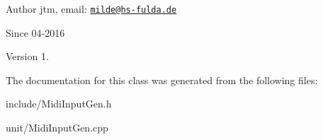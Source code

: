 \begin{DoxyAuthor}{Author}
jtm, email\-:  \href{mailto:milde@hs-fulda.de}{\tt milde@hs-\/fulda.\-de} 
\end{DoxyAuthor}
\begin{DoxySince}{Since}
04-\/2016 
\end{DoxySince}
\begin{DoxyVersion}{Version}
1. 
\end{DoxyVersion}


The documentation for this class was generated from the following files\-:\begin{DoxyCompactItemize}
\item 
include/Midi\-Input\-Gen.\-h\item 
unit/Midi\-Input\-Gen.\-cpp\end{DoxyCompactItemize}
